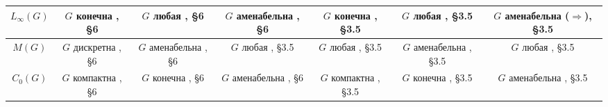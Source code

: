 \documentclass{article}
\numberwithin{equation}{section}
\theoremstyle{plain}
\theoremstyle{definition}
\begin{document}
\begin{fulltext}
\begin{table}[ht]
\begin{tiny}
{\begin{tabular}{|c|c|c|c|c|c|c|}
            \hline
                $L_\infty(G)$ & 
    			\shortstack{
    				$G$ конечна \\ \cite{DalPolHomolPropGrAlg}, \S 6
    			} & 
    			\shortstack{
    				$G$ любая \\ \cite{DalPolHomolPropGrAlg}, \S 6
    			} & 
    			\shortstack{
    				$G$ аменабельна \\ \cite{DalPolHomolPropGrAlg}, \S 6
    			} & 
    			\shortstack{
    				$G$ конечна \\ \cite{RamsHomPropSemgroupAlg}, \S 3.5
    			} & 
    			\shortstack{
    				$G$ любая \\ \cite{RamsHomPropSemgroupAlg}, \S 3.5
    			} & 
    			\shortstack{
    				$G$ аменабельна \\ ($\Longrightarrow$)\cite{RamsHomPropSemgroupAlg}, \S 3.5
    			} \\ 
            \hline
                $M(G)$ & 
    			\shortstack{
    				$G$ дискретна \\ \cite{DalPolHomolPropGrAlg}, \S 6
    			} & 
    			\shortstack{
    				$G$ аменабельна \\ \cite{DalPolHomolPropGrAlg}, \S 6
    			} & 
    			\shortstack{
    				$G$ любая \\ \cite{RamsHomPropSemgroupAlg}, \S 3.5
    			} & 
    			\shortstack{
    				$G$ любая \\ \cite{RamsHomPropSemgroupAlg}, \S 3.5
    			} & 
    			\shortstack{
    				$G$ аменабельна \\ \cite{RamsHomPropSemgroupAlg}, \S 3.5
    			} & 
    			\shortstack{
    				$G$ любая \\ \cite{RamsHomPropSemgroupAlg}, \S 3.5
    			} \\ 
            \hline
                $C_0(G)$ & 
    			\shortstack{
    				$G$ компактна \\ \cite{DalPolHomolPropGrAlg}, \S 6
    			} & 
    			\shortstack{
    				$G$ конечна \\ \cite{DalPolHomolPropGrAlg}, \S 6
    			} & 
    			\shortstack{
    				$G$ аменабельна \\ \cite{DalPolHomolPropGrAlg}, \S 6
    			} & 
    			\shortstack{
    				$G$ компактна \\ \cite{RamsHomPropSemgroupAlg}, \S 3.5
    			} & 
    			\shortstack{
    				$G$ конечна \\ \cite{RamsHomPropSemgroupAlg}, \S 3.5
    			} & 
    			\shortstack{
    				$G$ аменабельна \\ \cite{RamsHomPropSemgroupAlg}, \S 3.5
}
\end{tabular}}
\end{tiny}
\end{table}
\end{fulltext}
\end{document}
